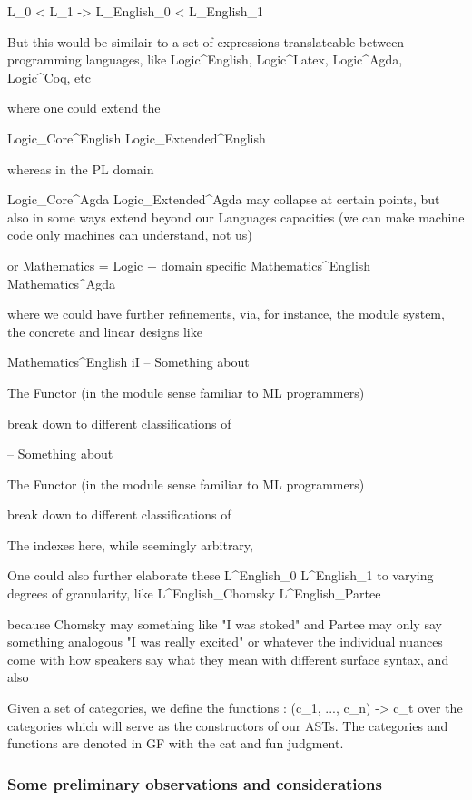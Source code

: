   L_0 < L_1 -> L_English_0 < L_English_1

But this would be similair to a set of expressions translateable between
programming languages, like Logic^English, Logic^Latex, Logic^Agda, Logic^Coq,
etc

where one could extend the

Logic_Core^English Logic_Extended^English

whereas in the PL domain

Logic_Core^Agda Logic_Extended^Agda may collapse at certain points, but also in
some ways extend beyond our Languages capacities (we can make machine code only
machines can understand, not us)

or Mathematics = Logic + domain specific Mathematics^English Mathematics^Agda

where we could have further refinements, via, for instance, the module system,
the concrete and linear designs like

Mathematics^English iI -- Something about

  The Functor (in the module sense familiar to ML programmers)

  break down to different classifications of

-- Something about

  The Functor (in the module sense familiar to ML programmers)

  break down to different classifications of

  The indexes here, while seemingly arbitrary,

  One could also further elaborate these L^English_0 L^English_1 to varying
degrees of granularity, like L^English_Chomsky L^English_Partee

  because Chomsky may something like "I was stoked" and Partee may only say
something analogous "I was really excited" or whatever the individual nuances
come with how speakers say what they mean with different surface syntax, and
also

Given a set of categories, we define the functions \phi : (c_1, ..., c_n) -> c_t
over the categories which will serve as the constructors of our ASTs. The
categories and functions are denoted in GF with the cat and fun judgment.

\subsubsection {Some preliminary observations and considerations}


